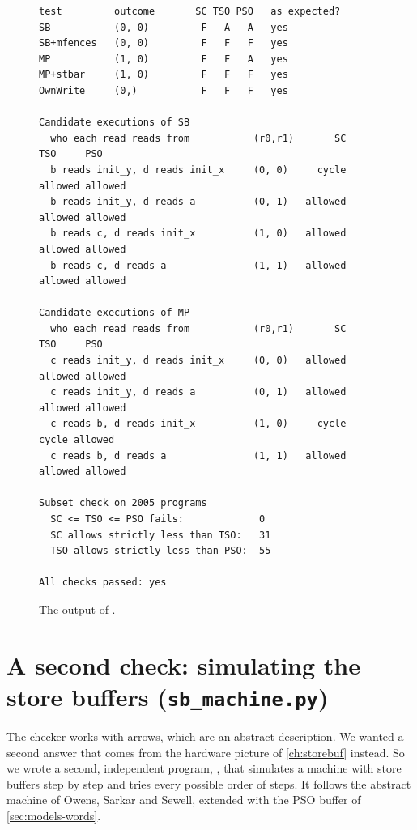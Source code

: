 \begin{figure}[!htbp]
\centering
\begin{lstlisting}[style=vscode]
test         outcome       SC TSO PSO   as expected?
SB           (0, 0)         F   A   A   yes
SB+mfences   (0, 0)         F   F   F   yes
MP           (1, 0)         F   F   A   yes
MP+stbar     (1, 0)         F   F   F   yes
OwnWrite     (0,)           F   F   F   yes

Candidate executions of SB
  who each read reads from           (r0,r1)       SC     TSO     PSO
  b reads init_y, d reads init_x     (0, 0)     cycle allowed allowed
  b reads init_y, d reads a          (0, 1)   allowed allowed allowed
  b reads c, d reads init_x          (1, 0)   allowed allowed allowed
  b reads c, d reads a               (1, 1)   allowed allowed allowed

Candidate executions of MP
  who each read reads from           (r0,r1)       SC     TSO     PSO
  c reads init_y, d reads init_x     (0, 0)   allowed allowed allowed
  c reads init_y, d reads a          (0, 1)   allowed allowed allowed
  c reads b, d reads init_x          (1, 0)     cycle   cycle allowed
  c reads b, d reads a               (1, 1)   allowed allowed allowed

Subset check on 2005 programs
  SC <= TSO <= PSO fails:             0
  SC allows strictly less than TSO:   31
  TSO allows strictly less than PSO:  55

All checks passed: yes
\end{lstlisting}
\caption{The output of .}
\label{fig:checkout}
\end{figure}

\section{A second check: simulating the store buffers (\texttt{sb\_machine.py})}
\label{sec:sim}

The checker works with arrows, which are an abstract description. We wanted a second answer that comes from the hardware picture of \cref{ch:storebuf} instead. So we wrote a second, independent program, , that simulates a machine with store buffers step by step and tries every possible order of steps. It follows the abstract machine of Owens, Sarkar and Sewell\cite{owens2009}, extended with the PSO buffer of \cref{sec:models-words}.

